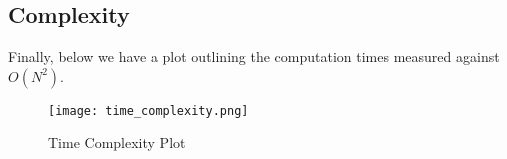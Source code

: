 \documentclass[12pt]{article}
\begin{document}
\subsection{Complexity}
Finally, below we have a plot outlining the computation times measured against $O(N^{2})$.
\begin{figure}[htb]
\begin{center}
\texttt{[image: time\_complexity.png]}
\caption{Time Complexity Plot}
\end{center}
\end{figure}
\end{document}
